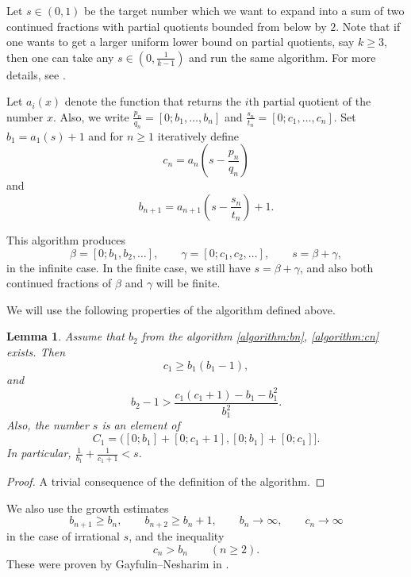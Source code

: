 \documentclass[11pt]{amsart}
\newtheorem{lemma}[theorem]{Lemma}
\newcommand{\cf}[1]{[0;#1]}
\begin{document}
Let $s\in(0,1)$ be the target number which we want to expand into a sum of two continued fractions with partial quotients bounded from below by $2$. Note that if one wants to get a larger uniform lower bound on partial quotients, say $k\geq3$, then one can take any $s\in(0,\frac{1}{k-1})$ and run the same algorithm. For more details, see \cite{ShulgaCusick}.

Let $a_i(x)$ denote the function that returns the $i$th partial quotient of the number $x$. Also, we write $\frac{p_n}{q_n}=[0;b_1,\ldots,b_n]$ and $\frac{s_n}{t_n}=[0;c_1,\ldots,c_n]$. Set $b_1  = a_1(s)+1$ and for $n\geq1$ iteratively define
\begin{equation}\label{algorithm:bn}
c_n = a_n \left(    s - \frac{p_n}{q_n}  \right)
\end{equation}
and
\begin{equation}\label{algorithm:cn}
b_{n+1} = a_{n+1} \left(    s - \frac{s_n}{t_n}  \right)  +1.
\end{equation}

This algorithm produces
$$
        \beta=\cf{b_1,b_2,\ldots},
        \qquad
        \gamma=\cf{c_1,c_2,\ldots},
        \qquad
        s=\beta+\gamma,
$$
in the infinite case.  In the finite case, we still have $s=\beta+\gamma$, and also both continued fractions of $\beta$ and $\gamma$ will be finite.

We will use the following properties of the algorithm defined above.
\begin{lemma}\label{lem:first-second}
Assume that $b_2$ from the algorithm \eqref{algorithm:bn}, \eqref{algorithm:cn} exists.  Then
\begin{equation}\label{eq:first-step}
        c_1\geq b_1(b_1-1),
\end{equation}
and
\begin{equation}\label{eq:second-step}
        b_2-1>
        \frac{c_1(c_1+1)-b_1-b_1^2}{b_1^2}.
\end{equation}
Also, the number $s$ is an element of
\begin{equation}\label{def:C1}
       C_1=\bigl(\cf{b_1}+\cf{c_1+1},\cf{b_1}+\cf{c_1}\bigr].
\end{equation}
 In particular, $\frac{1}{b_1}+\frac{1}{c_1+1}<s$.
\end{lemma}
\begin{proof}
    A trivial consequence of the definition of the algorithm.
\end{proof}




We also use the growth estimates
$$
        b_{n+1}\ge b_n,
        \qquad
        b_{n+2}\ge b_n+1,
        \qquad
        b_n\to\infty,
        \qquad
        c_n\to\infty
$$
in the case of irrational $s$, and the inequality
$$
        c_n>b_n\qquad(n\ge2).
$$
These were proven by Gayfulin--Nesharim in \cite{gayfulin2025realnumbersumreal}.
\end{document}
